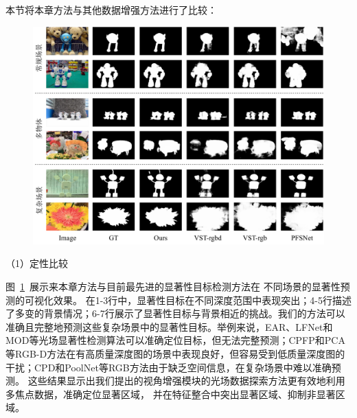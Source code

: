 
本节将本章方法与其他数据增强方法进行了比较：

\begin{figure}
	\centering
	\includegraphics[width=\linewidth]{figures/chapter3/compare_3}
	\label{chpt4:fig:comparison_3}
	\vspace{-0.2cm}
\end{figure}
% 
%

（1）定性比较


图~\ref{chpt4:fig:comparison_3}~展示来本章方法与目前最先进的显著性目标检测方法在
不同场景的显著性预测的可视化效果。
\todo 
在1-3行中，显著性目标在不同深度范围中表现突出；4-5行描述了多变的背景情况；6-7行展示了显著性目标与背景相近的挑战。我们的方法可以准确且完整地预测这些复杂场景中的显著性目标。举例来说，EAR、LFNet和MOD等光场显著性检测算法可以准确定位目标，但无法完整预测；CPFP和PCA等RGB-D方法在有高质量深度图的场景中表现良好，但容易受到低质量深度图的干扰；CPD和PoolNet等RGB方法由于缺乏空间信息，在复杂场景中难以准确预测。
%
%
%
%
%
这些结果显示出我们提出的视角增强模块的光场数据探索方法更有效地利用多焦点数据，准确定位显著区域，
并在特征整合中突出显著区域、抑制非显著区域。



